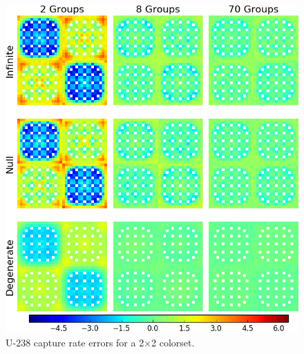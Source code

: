 \begin{figure}[h!]
\centering
\includegraphics[width=\linewidth]{figures/quantification/2x2/capt-err}
\caption[U-238 capture rate errors for a 2$\times$2 colorset]{U-238 capture rate errors for a 2$\times$2 colorset.}
\label{fig:chap8-2x2-capt-err}
\end{figure}

